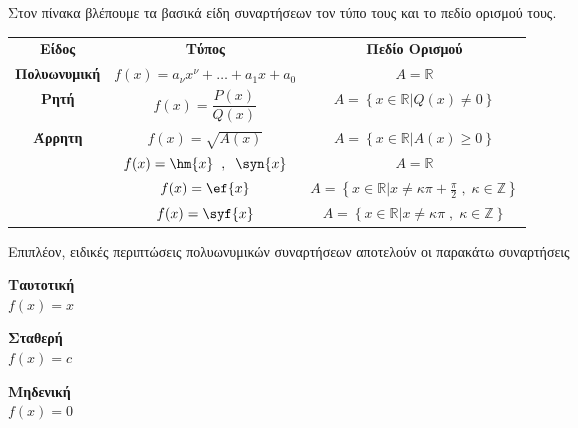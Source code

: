 \documentclass[twoside,11pt,a4paper,openany]{book}
\begin{document}
Στον πίνακα βλέπουμε τα βασικά είδη συναρτήσεων τον τύπο τους και το πεδίο ορισμού τους.
\begin{center}
\begin{longtable}{ccc}
\hline \rule[-2ex]{0pt}{5.5ex}\textbf{Είδος} & \textbf{Τύπος} & \textbf{Πεδίο Ορισμού} \\ 
\hhline{===} \rule[-2ex]{0pt}{5.5ex} \textbf{Πολυωνυμική} & $ f(x)=a_\nu x^\nu+\ldots+a_1x+a_0 $ & $ A=\mathbb{R} $ \\
\rule[-2ex]{0pt}{5.5ex} \textbf{Ρητή} & $ f(x)=\dfrac{P(x)}{Q(x)} $ & $ A=\left\lbrace\left.  x\in\mathbb{R}\right| Q(x)\neq0\right\rbrace $  \\
\rule[-2ex]{0pt}{5.5ex} \textbf{Άρρητη} & $ f(x)=\sqrt{A(x)} $ & $ A=\left\lbrace\left. x\in\mathbb{R}\right| A(x)\geq0\right\rbrace $ \\
\hhline{~--}\rule[-2ex]{0pt}{5.5ex} \multirow{5}{*}{\textbf{Τριγωνομετρική}} & $ f(x)=\hm{x}\;\;,\;\;\syn{x} $ & $ A=\mathbb{R} $ \\ 
\rule[-2ex]{0pt}{5.5ex}  & $ f(x)=\ef{x} $ & $ A=\left\lbrace\left.x\in\mathbb{R}\right| x\neq\kappa\pi+\frac{\pi}{2}\;,\;\kappa\in\mathbb{Z}\right\rbrace $ \\ 
\rule[-2ex]{0pt}{5.5ex}  & $ f(x)=\syf{x} $ & $ A=\left\lbrace\left.x\in\mathbb{R}\right| x\neq\kappa\pi\;,\;\kappa\in\mathbb{Z}\right\rbrace $ \\ 
\hline 
\end{longtable}
\end{center}
\vspace{-.8cm}
Επιπλέον, ειδικές περιπτώσεις πολυωνυμικών συναρτήσεων αποτελούν οι παρακάτω συναρτήσεις
\begin{center}
\begin{minipage}{2.5cm}
\textbf{Ταυτοτική}\\$ f(x)=x $
\end{minipage}\qquad
\begin{minipage}{2.5cm}
\textbf{Σταθερή}\\$ f(x)=c $
\end{minipage}\qquad
\begin{minipage}{2.5cm}
\textbf{Μηδενική}\\$ f(x)=0 $
\end{minipage}
\end{center}
\end{document}
